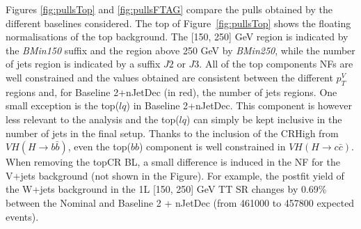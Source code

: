 Figures \ref{fig:pullsTop} and \ref{fig:pullsFTAG} compare the pulls obtained by the different baselines considered. The top of Figure~\ref{fig:pullsTop} shows the floating normalisations of the top background. The [150, 250] GeV region is indicated by the \textit{BMin150} suffix and the region above 250 GeV by \textit{BMin250}, while the number of jets region is indicated by a suffix $J2$ or $J3$. All of the top components NFs are well constrained and the values obtained are consistent between the different $p_T^V$ regions and, for Baseline 2+nJetDec (in red), the number of jets regions. One small exception is the top($lq$) in Baseline 2+nJetDec. This component is however less relevant to the analysis and the top($lq$) can simply be kept inclusive in the number of jets in the final setup. Thanks to the inclusion of the CRHigh from $VH(H\rightarrow b\bar{b})$, even the top($bb$) component is well constrained in $VH(H\rightarrow c\bar{c})$. When removing the topCR BL, a small difference is induced in the NF for the V+jets background (not shown in the Figure). For example, the postfit yield of the W+jets background in the 1L [150, 250] GeV TT SR changes by 0.69\% between the Nominal and Baseline 2 + nJetDec (from 461000 to 457800 expected events). \\


